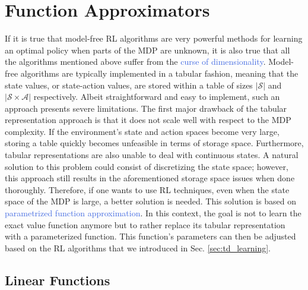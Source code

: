 \section{Function Approximators}
\label{sec:function_approximators}
If it is true that model-free RL algorithms are very powerful methods for learning an optimal policy when parts of the MDP are unknown, it is also true that all the algorithms mentioned above suffer from the \textcolor{RoyalBlue}{curse of dimensionality}. Model-free algorithms are typically implemented in a tabular fashion, meaning that the state values, or state-action values, are stored within a table of sizes $|\mathcal{S}|$ and $|\mathcal{S}\times\mathcal{A}|$ respectively. Albeit straightforward and easy to implement, such an approach presents severe limitations. The first major drawback of the tabular representation approach is that it does not scale well with respect to the MDP complexity. If the environment's state and action spaces become very large, storing a table quickly becomes unfeasible in terms of storage space. Furthermore, tabular representations are also unable to deal with continuous states. A natural solution to this problem could consist of discretizing the state space; however, this approach still results in the aforementioned storage space issues when done thoroughly. Therefore, if one wants to use RL techniques, even when the state space of the MDP is large, a better solution is needed. This solution is based on \textcolor{RoyalBlue}{parametrized function approximation}. In this context, the goal is not to learn the exact value function anymore but to rather replace its tabular representation with a parameterized function. This function's parameters can then be adjusted based on the RL algorithms that we introduced in Sec. \ref{sec:td_learning}. 

\subsection{Linear Functions}
\label{sec:linear_functions}

